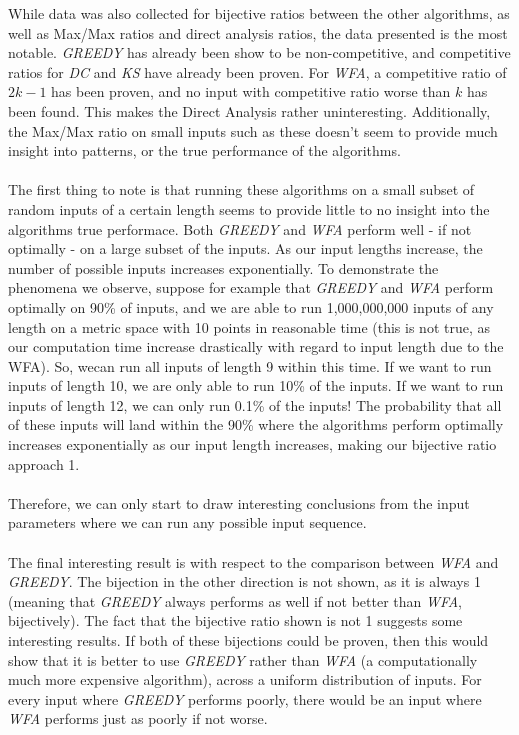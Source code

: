 While data was also collected for bijective ratios between the other algorithms, as well as Max/Max ratios and direct analysis ratios, the data presented is the most notable. \textit{GREEDY} has already been show to be non-competitive, and competitive ratios for \textit{DC} and \textit{KS} have already been proven. For \textit{WFA}, a competitive ratio of $2k-1$ has been proven, and no input with competitive ratio worse than $k$ has been found. This makes the Direct Analysis rather uninteresting. Additionally, the Max/Max ratio on small inputs such as these doesn't seem to provide much insight into patterns, or the true performance of the algorithms.
\\ \\
The first thing to note is that running these algorithms on a small subset of random inputs of a certain length seems to provide little to no insight into the algorithms true performace. Both \textit{GREEDY} and \textit{WFA} perform well - if not optimally - on a large subset of the inputs. As our input lengths increase, the number of possible inputs increases exponentially. To demonstrate the phenomena we observe, suppose for example that \textit{GREEDY} and \textit{WFA} perform optimally on 90\% of inputs, and we are able to run 1,000,000,000 inputs of any length on a metric space with 10 points in reasonable time (this is not true, as our computation time increase drastically with regard to input length due to the WFA). So, wecan run all inputs of length 9 within this time. If we want to run inputs of length 10, we are only able to run 10\% of the inputs. If we want to run inputs of length 12, we can only run 0.1\% of the inputs! The probability that all of these inputs will land within the 90\% where the algorithms perform optimally increases exponentially as our input length increases, making our bijective ratio approach 1.
\\ \\
Therefore, we can only start to draw interesting conclusions from the input parameters where we can run any possible input sequence.
\\ \\
The final interesting result is with respect to the comparison between \textit{WFA} and \textit{GREEDY}. The bijection in the other direction is not shown, as it is always 1 (meaning that \textit{GREEDY} always performs as well if not better than \textit{WFA}, bijectively). The fact that the bijective ratio shown is not 1 suggests some interesting results. If both of these bijections could be proven, then this would show that it is better to use \textit{GREEDY} rather than \textit{WFA} (a computationally much more expensive algorithm), across a uniform distribution of inputs. For every input where \textit{GREEDY} performs poorly, there would be an input where \textit{WFA} performs just as poorly if not worse.  